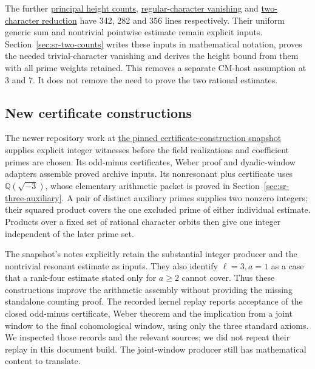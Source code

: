 The further
\href{https://github.com/antoshashakov/riemann-hypothesis/blob/442bb98b2aa223ac4f28ec86e754e1a54b3ae081/verification/PrincipalHeightCounts.lean}{principal height counts},
\href{https://github.com/antoshashakov/riemann-hypothesis/blob/b8afa4ee2aca3cb3478b1f706cac6b03b258b9fe/verification/RegularCharacterHeight.lean}{regular-character vanishing}
and
\href{https://github.com/antoshashakov/riemann-hypothesis/blob/76ffabc62ab67b126afc128013ab6efa6f7d2a7c/verification/TwoCharacterCounts.lean}{two-character reduction}
have 342, 282 and 356 lines respectively.
Their uniform generic sum and nontrivial pointwise estimate remain
explicit inputs.
Section~\ref{sec:sr-two-counts} writes these inputs in mathematical
notation, proves the needed trivial-character vanishing and derives
the height bound from them with all prime weights retained.
This removes a separate CM-host assumption at 3 and 7.
It does not remove the need to prove the two rational estimates.

\subsection{New certificate constructions}
The newer repository work at
\href{https://github.com/ChristianKudeba/alpoge-rh-verification/tree/6186b8d5c272c08c90f6f5cce1a25d22232ed78d/verification/research/certificate-construction}{the pinned certificate-construction snapshot}
supplies explicit integer witnesses before the field realizations and
coefficient primes are chosen.
Its odd-minus certificates, Weber proof and dyadic-window adapters
assemble proved archive inputs. Its nonresonant plus certificate
uses \(\mathbb Q(\sqrt{-3})\), whose elementary arithmetic packet
is proved in Section~\ref{sec:sr-three-auxiliary}.
A pair of distinct auxiliary primes supplies two nonzero integers;
their squared product covers the one excluded prime of either
individual estimate. Products over a fixed set of rational character
orbits then give one integer independent of the later prime set.

The snapshot's notes explicitly retain the substantial
 integer producer and the nontrivial resonant estimate
as inputs. They also identify \(\ell=3,a=1\) as a case that a
rank-four estimate stated only for \(a\geq2\) cannot cover.
Thus these constructions improve the arithmetic assembly without
providing the missing standalone counting proof.
The recorded kernel replay reports acceptance of the closed
odd-minus certificate, Weber theorem and the implication from a joint
window to the final cohomological window, using only the three standard
axioms. We inspected those records and the relevant sources; we did not
repeat their replay in this document build.
The joint-window producer still has mathematical content to translate.

